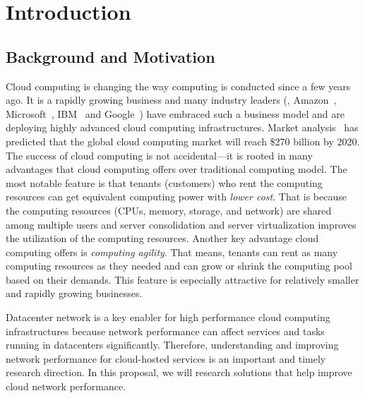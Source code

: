 \section{Introduction}
\label{ch:intro}

\subsection{Background and Motivation}
Cloud computing is changing the way computing is conducted since a few years ago.
It is a rapidly growing business and many industry leaders 
(\eg{}, Amazon~\cite{amazon-aws},
Microsoft~\cite{microsoft-azure}, IBM~\cite{ibm-softlayer,ibm-bluemix} and
Google~\cite{google-compute}) have embraced such a 
business model and are deploying highly advanced cloud computing infrastructures. 
Market analysis~\cite{cloud-market2020} 
has predicted that the global cloud computing market will 
reach \$270 billion by 2020. The success of cloud computing is 
not accidental---it is rooted in many advantages that cloud computing offers 
over traditional computing model. The most notable feature is that tenants 
(customers) who rent the computing resources can get equivalent computing power 
with \emph{lower cost}. That is because the computing resources 
(CPUs, memory, storage, and network) are shared among multiple users and 
server consolidation and server virtualization improves the utilization 
of the computing resources. Another key advantage cloud computing offers 
is \emph{computing agility}. That means, tenants can rent as many computing 
resources as they needed and can grow or shrink the computing pool based on their demands. 
This feature is especially attractive for relatively smaller and 
rapidly growing businesses.

\iffalse
Building high performance, highly secure cloud computing infrastructures 
requires substantial research and engineering efforts. Lots of 
optimizations need to be done throughout the infrastructure, for example, 
server virtualization techniques, high throughput and low latency data center 
network design, highly robust and fast Internet access to cloud-hosted services, 
scalable and efficient big data analytics platforms etc. 
\fi
Datacenter network is a key enabler for high performance cloud computing infrastructures 
because network performance can affect services and tasks running in datacenters significantly. 
Therefore, understanding and improving network performance for cloud-hosted services is 
an important and timely research direction.
In this proposal, 
we will research solutions that help improve cloud network performance.


